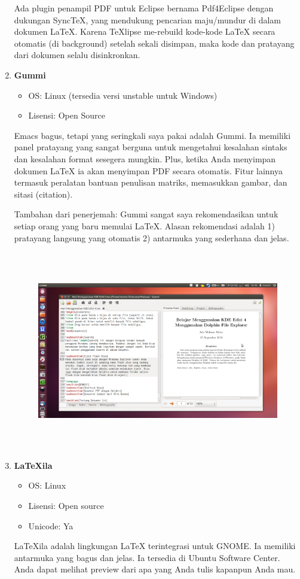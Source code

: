 \documentclass[12pt,a4paper]{article}
\begin{document}
\begin{enumerate}
Ada plugin penampil PDF untuk Eclipse bernama Pdf4Eclipse dengan dukungan SyncTeX, yang mendukung pencarian maju/mundur di dalam dokumen LaTeX. Karena TeXlipse me-rebuild kode-kode LaTeX secara otomatis (di background) setelah sekali disimpan, maka kode dan pratayang dari dokumen selalu disinkronkan.

\item \textbf{Gummi}
\begin{itemize}
\item OS: Linux (tersedia versi unstable untuk Windows)
\item Lisensi: Open Source
\end{itemize}


Emacs bagus, tetapi yang seringkali saya pakai adalah Gummi. Ia memiliki panel pratayang yang sangat berguna untuk mengetahui kesalahan sintaks dan kesalahan format sesegera mungkin. Plus, ketika Anda menyimpan dokumen LaTeX ia akan menyimpan PDF secara otomatis. Fitur lainnya termasuk peralatan bantuan penulisan matriks, memasukkan gambar, dan 
sitasi (citation).
\par \vspace{12pt}
Tambahan dari penerjemah: Gummi sangat saya rekomendasikan untuk setiap orang yang baru memulai LaTeX. Alasan rekomendasi adalah 1) pratayang langsung yang otomatis 2) antarmuka yang sederhana dan jelas.

\begin{figure}[ht]
\centering
\includegraphics[width=15.45cm,height=8.68cm]{gambar/image10.jpg}
\end{figure}

\item \textbf{LaTeXila}
\begin{itemize}
\item OS: Linux
\item Lisensi: Open source
\item Unicode: Ya
\end{itemize}
\hspace{0,5in}LaTeXila adalah lingkungan LaTeX terintegrasi untuk GNOME. Ia memiliki antarmuka yang bagus dan jelas. Ia tersedia di Ubuntu Software Center. Anda dapat melihat preview dari apa yang Anda tulis kapanpun Anda mau.
\par \vspace{12pt}


\end{enumerate}
\end{document}
